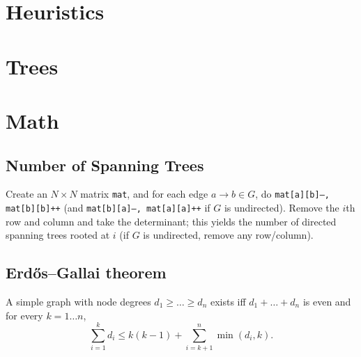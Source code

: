 \section{Heuristics}

\section{Trees}

\section{Math}
\subsection{Number of Spanning Trees}
Create an $N\times N$ matrix \texttt{mat}, and for each edge $a \rightarrow b \in G$, do
\texttt{mat[a][b]--, mat[b][b]++} (and \texttt{mat[b][a]--, mat[a][a]++} if $G$ is undirected).
Remove the $i$th row and column and take the determinant; this yields the number of directed spanning trees rooted at $i$
(if $G$ is undirected, remove any row/column).

\subsection{Erdős–Gallai theorem}
A simple graph with node degrees $d_1 \ge \dots \ge d_n$ exists iff $d_1 + \dots + d_n$ is even and for every $k = 1\dots n$,
\[ \sum _{i=1}^{k}d_{i}\leq k(k-1)+\sum _{i=k+1}^{n}\min(d_{i},k). \]
